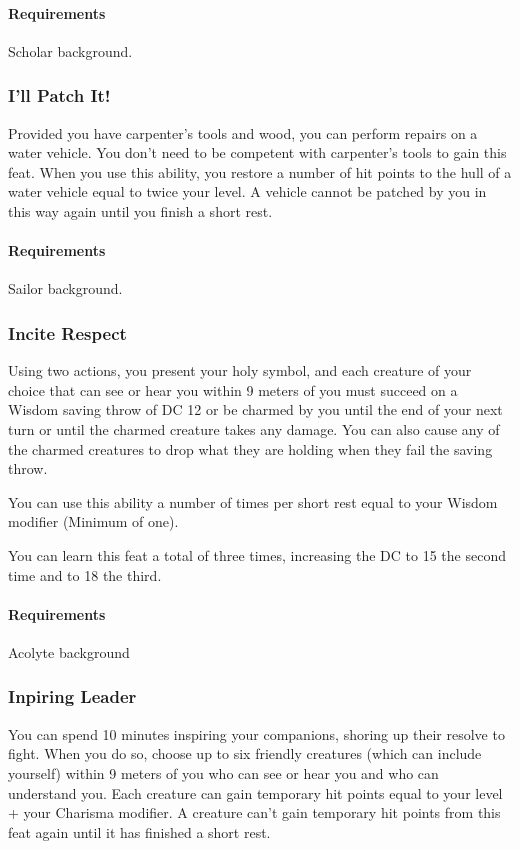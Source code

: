     \paragraph{Requirements} Scholar background.
\subsubsection{I'll Patch It!} \label{feat::illpatchit}
    Provided you have carpenter's tools and wood, you can perform repairs on a water vehicle.
    You don't need to be competent with carpenter's tools to gain this feat.
    When you use this ability, you restore a number of hit points to the hull of a water vehicle equal to twice your level.
    A vehicle cannot be patched by you in this way again until you finish a short rest.
    \paragraph{Requirements} Sailor background.
\subsubsection{Incite Respect} \label{feat::inciterespect}
    Using two actions, you present your holy symbol, and each creature of your choice that can see or hear you within 9 meters of you must succeed on a Wisdom saving throw of DC 12 or be charmed by you until the end of your next turn or until the charmed creature takes any damage.
    You can also cause any of the charmed creatures to drop what they are holding when they fail the saving throw.

    You can use this ability a number of times per short rest equal to your Wisdom modifier (Minimum of one).

    You can learn this feat a total of three times, increasing the DC to 15 the second time and to 18 the third.
    \paragraph{Requirements} Acolyte background
\subsubsection{Inpiring Leader} \label{feat::inspiringleader}
    You can spend 10 minutes inspiring your companions, shoring up their resolve to fight.
    When you do so, choose up to six friendly creatures (which can include yourself) within 9 meters of you who can see or hear you and who can understand you.
    Each creature can gain temporary hit points equal to your level + your Charisma modifier.
    A creature can't gain temporary hit points from this feat again until it has finished a short rest.
